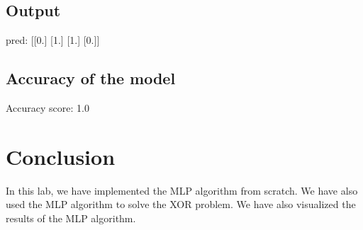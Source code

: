 \subsection{Output}
pred:  [[0.]
 [1.]
 [1.]
 [0.]]
\subsection{Accuracy of the model}
Accuracy score: 1.0


\section{Conclusion}
In this lab, we have implemented the MLP algorithm from scratch. We have also used the MLP algorithm to solve the XOR problem. We have also visualized the results of the MLP algorithm.\\